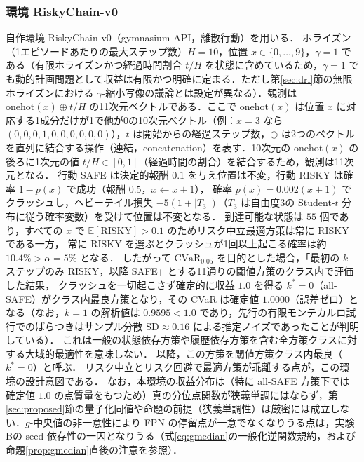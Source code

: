 \documentclass[a4paper,10pt]{jsarticle}
\theoremstyle{definition}
\newcommand{\CVaR}{\mathrm{CVaR}}
\newcommand{\E}{\mathbb{E}}
\begin{document}
\subsubsection{環境 RiskyChain-v0}
自作環境 RiskyChain-v0（gymnasium API，離散行動）を用いる．
ホライズン（1エピソードあたりの最大ステップ数）$H=10$，位置 $x\in\{0,\dots,9\}$，$\gamma=1$ である（有限ホライズンかつ経過時間割合 $t/H$ を状態に含めているため，$\gamma=1$ でも動的計画問題として収益は有限かつ明確に定まる．ただし第\ref{sec:drl}節の無限ホライズンにおける $\gamma$-縮小写像の議論とは設定が異なる）．観測は $\mathrm{onehot}(x)\oplus t/H$ の11次元ベクトルである．ここで $\mathrm{onehot}(x)$ は位置 $x$ に対応する1成分だけが1で他が0の10次元ベクトル（例：$x=3$ なら $(0,0,0,1,0,0,0,0,0,0)$），$t$ は開始からの経過ステップ数，$\oplus$ は2つのベクトルを直列に結合する操作（連結，concatenation）を表す．10次元の $\mathrm{onehot}(x)$ の後ろに1次元の値 $t/H\in[0,1]$（経過時間の割合）を結合するため，観測は11次元となる．
行動 SAFE は決定的報酬 $0.1$ を与え位置は不変，行動 RISKY は確率 $1-p(x)$ で成功（報酬 $0.5$，$x\leftarrow x+1$），
確率 $p(x)=0.002(x+1)$ でクラッシュし，ヘビーテイル損失 $-5(1+|T_3|)$（$T_3$ は自由度3の Student-$t$ 分布に従う確率変数）を受けて位置は不変となる．
到達可能な状態は $55$ 個であり，すべての $x$ で $\E[\mathrm{RISKY}]>0.1$ のためリスク中立最適方策は常に RISKY である一方，
常に RISKY を選ぶとクラッシュが1回以上起こる確率は約 $10.4\%>\alpha=5\%$ となる．
したがって $\CVaR_{0.05}$ を目的とした場合，「最初の $k$ ステップのみ RISKY，以降 SAFE」とする11通りの閾値方策のクラス内で評価した結果，
クラッシュを一切起こさず確定的に収益 $1.0$ を得る $k^*=0$（all-SAFE）がクラス内最良方策となり，その CVaR は確定値 $1.0000$（誤差ゼロ）となる（なお，$k=1$ の解析値は $0.9595<1.0$ であり，先行の有限モンテカルロ試行でのばらつきはサンプル分散 $\mathrm{SD}\approx0.16$ による推定ノイズであったことが判明している）．
これは一般の状態依存方策や履歴依存方策を含む全方策クラスに対する大域的最適性を意味しない．
以降，この方策を閾値方策クラス内最良（$k^*=0$）と呼ぶ．
リスク中立とリスク回避で最適方策が乖離する点が，この環境の設計意図である．
なお，本環境の収益分布は（特に all-SAFE 方策下では確定値 $1.0$ の点質量をもつため）真の分位点関数が狭義単調にはならず，第\ref{sec:proposed}節の量子化同値や命題の前提（狭義単調性）は厳密には成立しない．$g$-中央値の非一意性により FPN の停留点が一意でなくなりうる点は，実験Bの seed 依存性の一因となりうる（式\eqref{eq:gmedian}の一般化逆関数規約，および命題\ref{prop:gmedian}直後の注意を参照）．
\end{document}
